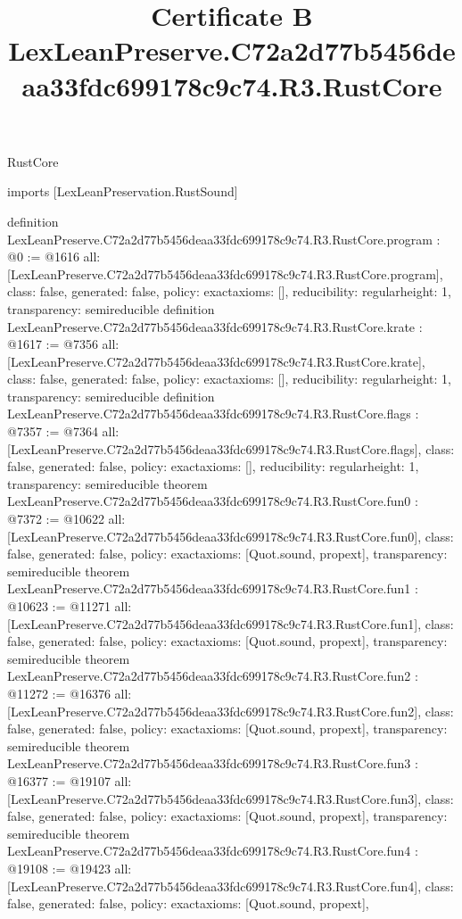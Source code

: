 \begin{lexlean}{RustCore}
\title{Certificate B LexLeanPreserve.C72a2d77b5456deaa33fdc699178c9c74.R3.RustCore}
\begin{coremodule}
imports [LexLeanPreservation.RustSound]

definition LexLeanPreserve.C72a2d77b5456deaa33fdc699178c9c74.R3.RustCore.program : @0 := @1616 {
  all: [LexLeanPreserve.C72a2d77b5456deaa33fdc699178c9c74.R3.RustCore.program],
  class: false,
  generated: false,
  policy: exact{axioms: []},
  reducibility: regular{height: 1},
  transparency: semireducible
}
definition LexLeanPreserve.C72a2d77b5456deaa33fdc699178c9c74.R3.RustCore.krate : @1617 := @7356 {
  all: [LexLeanPreserve.C72a2d77b5456deaa33fdc699178c9c74.R3.RustCore.krate],
  class: false,
  generated: false,
  policy: exact{axioms: []},
  reducibility: regular{height: 1},
  transparency: semireducible
}
definition LexLeanPreserve.C72a2d77b5456deaa33fdc699178c9c74.R3.RustCore.flags : @7357 := @7364 {
  all: [LexLeanPreserve.C72a2d77b5456deaa33fdc699178c9c74.R3.RustCore.flags],
  class: false,
  generated: false,
  policy: exact{axioms: []},
  reducibility: regular{height: 1},
  transparency: semireducible
}
theorem LexLeanPreserve.C72a2d77b5456deaa33fdc699178c9c74.R3.RustCore.fun0 : @7372 := @10622 {
  all: [LexLeanPreserve.C72a2d77b5456deaa33fdc699178c9c74.R3.RustCore.fun0],
  class: false,
  generated: false,
  policy: exact{axioms: [Quot.sound, propext]},
  transparency: semireducible
}
theorem LexLeanPreserve.C72a2d77b5456deaa33fdc699178c9c74.R3.RustCore.fun1 : @10623 := @11271 {
  all: [LexLeanPreserve.C72a2d77b5456deaa33fdc699178c9c74.R3.RustCore.fun1],
  class: false,
  generated: false,
  policy: exact{axioms: [Quot.sound, propext]},
  transparency: semireducible
}
theorem LexLeanPreserve.C72a2d77b5456deaa33fdc699178c9c74.R3.RustCore.fun2 : @11272 := @16376 {
  all: [LexLeanPreserve.C72a2d77b5456deaa33fdc699178c9c74.R3.RustCore.fun2],
  class: false,
  generated: false,
  policy: exact{axioms: [Quot.sound, propext]},
  transparency: semireducible
}
theorem LexLeanPreserve.C72a2d77b5456deaa33fdc699178c9c74.R3.RustCore.fun3 : @16377 := @19107 {
  all: [LexLeanPreserve.C72a2d77b5456deaa33fdc699178c9c74.R3.RustCore.fun3],
  class: false,
  generated: false,
  policy: exact{axioms: [Quot.sound, propext]},
  transparency: semireducible
}
theorem LexLeanPreserve.C72a2d77b5456deaa33fdc699178c9c74.R3.RustCore.fun4 : @19108 := @19423 {
  all: [LexLeanPreserve.C72a2d77b5456deaa33fdc699178c9c74.R3.RustCore.fun4],
  class: false,
  generated: false,
  policy: exact{axioms: [Quot.sound, propext]},
}
\end{coremodule}
\end{lexlean}
